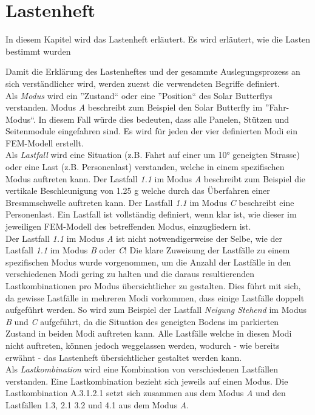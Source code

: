 \section{Lastenheft}
In diesem Kapitel wird das Lastenheft erläutert. Es wird erläutert, wie die Lasten bestimmt wurden

Damit die Erklärung des Lastenheftes und der gesammte Auslegungsprozess an sich verständlicher wird, werden zuerst die verwendeten Begriffe definiert.\\
Als \emph{Modus} wird ein ''Zustand`` oder eine ''Position`` des Solar Butterflys verstanden. Modus \emph{A} beschreibt zum Beispiel den Solar Butterfly im ''Fahr-Modus``. In diesem Fall würde dies bedeuten, dass alle Panelen, Stützen und Seitenmodule eingefahren sind. Es wird für jeden der vier definierten Modi ein FEM-Modell erstellt.\\
Als \emph{Lastfall} wird eine Situation (z.B. Fahrt auf einer um 10° geneigten Strasse) oder eine Last (z.B. Personenlast) verstanden, welche in einem spezifischen Modus auftreten kann. Der Lastfall \emph{1.1} im Modus \emph{A} beschreibt zum Beispiel die vertikale Beschleunigung von 1.25 g welche durch das Überfahren einer Bresmmschwelle auftreten kann. Der Lastfall \emph{1.1} im Modus \emph{C} beschreibt eine Personenlast. Ein Lastfall ist vollständig definiert, wenn klar ist, wie dieser im jeweiligen FEM-Modell des betreffenden Modus, einzugliedern ist.\\
Der Lastfall \emph{1.1} im Modus \emph{A} ist nicht notwendigerweise der Selbe, wie der Lastfall \emph{1.1} im Modus \emph{B} oder \emph{C}! Die klare Zuweisung der Lastfälle zu einem spezifischen Modus wurde vorgenommen, um die Anzahl der Lastfälle in den verschiedenen Modi gering zu halten und die daraus resultierenden Lastkombinationen pro Modus übersichtlicher zu gestalten. Dies führt mit sich, da gewisse Lastfälle in mehreren Modi vorkommen, dass einige Lastfälle doppelt aufgeführt werden. So wird zum Beispiel der Lastfall \emph{Neigung Stehend} im Modus \emph{B} und \emph{C} aufgeführt, da die Situation des geneigten Bodens im parkierten Zustand in beiden Modi auftreten kann. Alle Lastfälle welche in diesen Modi nicht auftreten, können jedoch weggelassen werden, wodurch - wie bereits erwähnt - das Lastenheft übersichtlicher gestaltet werden kann.\\
Als \emph{Lastkombination} wird eine Kombination von verschiedenen Lastfällen verstanden. Eine Lastkombination bezieht sich jeweils auf einen Modus. Die Lastkombination A.3.1.2.1 setzt sich zusammen aus dem Modus \emph{A} und den Lastfällen 1.3, 2.1 3.2 und 4.1 aus dem Modus \emph{A}.

